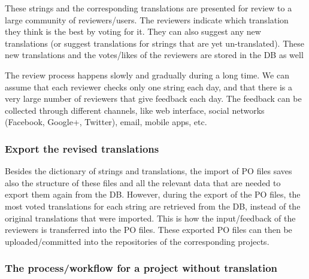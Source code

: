 \documentclass[11pt]{article}
\begin{document}
    These strings and the corresponding translations are presented for
    review to a large community of reviewers/users. The reviewers
    indicate which translation they think is the best by voting for it.
    They can also suggest any new translations (or suggest translations
    for strings that are yet un-translated). These new translations and
    the votes/likes of the reviewers are stored in the DB as well

    The review process happens slowly and gradually during a long
    time. We can assume that each reviewer checks only one string each
    day, and that there is a very large number of reviewers that give
    feedback each day. The feedback can be collected through different
    channels, like web interface, social networks (Facebook,
    Google+, Twitter), email, mobile apps, etc.

\subsubsection{Export the revised translations}
\label{sec-8.2.3}


    Besides the dictionary of strings and translations, the import of
    PO files saves also the structure of these files and all the
    relevant data that are needed to export them again from the
    DB. However, during the export of the PO files, the most voted
    translations for each string are retrieved from the DB, instead of
    the original translations that were imported. This is how the
    input/feedback of the reviewers is transferred into the PO
    files. These exported PO files can then be uploaded/committed into
    the repositories of the corresponding projects.

\subsubsection{The process/workflow for a project without translation}
\label{sec-8.2.4}
\end{document}
